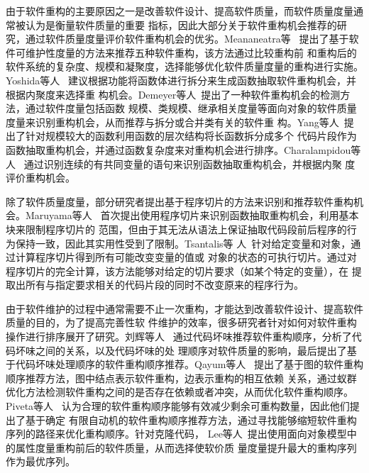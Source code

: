 由于软件重构的主要原因之一是改善软件设计、提高软件质量，而软件质量度量通常被认为是衡量软件质量的重要
指标，因此大部分关于软件重构机会推荐的研究，通过软件质量度量评价软件重构机会的优劣。Meananeatra等
~\cite{meananeatra2011using}提出了基于软件可维护性度量的方法来推荐五种软件重构，该方法通过比较重构前
和重构后的软件系统的复杂度、规模和凝聚度，选择能够优化软件质量度量的重构进行实施。Yoshida等人
~\cite{yoshida2012cohesion}建议根据功能将函数体进行拆分来生成函数抽取软件重构机会，并根据内聚度来选择重
构机会。Demeyer等人~\cite{demeyer2000finding}提出了一种软件重构机会的检测方法，通过软件度量包括函数
规模、类规模、继承相关度量等面向对象的软件质量度量来识别重构机会，从而推荐与拆分或合并类有关的软件重
构。Yang等人~\cite{yang2009identifying}提出了针对规模较大的函数利用函数的层次结构将长函数拆分成多个
代码片段作为函数抽取重构机会，并通过函数复杂度来对重构机会进行排序。Charalampidou等人
~\cite{charalampidou2016identifying}通过识别连续的有共同变量的语句来识别函数抽取重构机会，并根据内聚
度评价重构机会。

除了软件质量度量，部分研究者提出基于程序切片的方法来识别和推荐软件重构机会。Maruyama等人
~\cite{maruyama2001automated}首次提出使用程序切片来识别函数抽取重构机会，利用基本块来限制程序切片的
范围，但由于其无法从语法上保证抽取代码段前后程序的行为保持一致，因此其实用性受到了限制。Tsantalis等
人~\cite{tsantalis2011identification}针对给定变量和对象，通过计算程序切片得到所有可能改变变量的值或
对象的状态的可执行切片。通过对程序切片的完全计算，该方法能够对给定的切片要求（如某个特定的变量），在
提取出所有与指定要求相关的代码片段的同时不改变原来的程序行为。

由于软件维护的过程中通常需要不止一次重构，才能达到改善软件设计、提高软件质量的目的，为了提高完善性软
件维护的效率，很多研究者针对如何对软件重构操作进行排序展开了研究。刘辉等人
~\cite{liu2009facilitating}通过代码坏味推荐软件重构顺序，分析了代码坏味之间的关系，以及代码坏味的处
理顺序对软件质量的影响，最后提出了基于代码坏味处理顺序的软件重构顺序推荐。Qayum等人
~\cite{qayum2009local}提出了基于图的软件重构顺序推荐方法，图中结点表示软件重构，边表示重构的相互依赖
关系，通过蚁群优化方法检测软件重构之间的是否存在依赖或者冲突，从而优化软件重构顺序。Piveta等人
~\cite{piveta2008searching}认为合理的软件重构顺序能够有效减少剩余可重构数量，因此他们提出了基于确定
有限自动机的软件重构顺序推荐方法，通过寻找能够缩短软件重构序列的路径来优化重构顺序。针对克隆代码，
Lee等人~\cite{lee2011automated}提出使用面向对象模型中的属性度量重构前后的软件质量，从而选择使软价质
量度量提升最大的重构序列作为最优序列。
